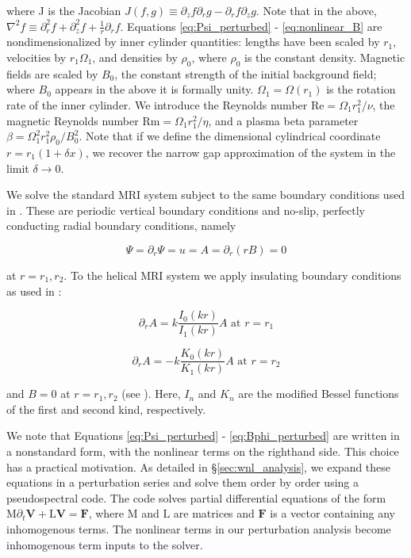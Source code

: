 \documentclass{emulateapj}
\newcommand{\beq}{\begin{equation}}
\newcommand{\eeq}{\end{equation}}
\newcommand{\citei}[1]{\citeauthor{#1} \citeyear{#1}}
\newcommand\reye{\mathrm{Re}}
\newcommand\reym{\mathrm{Rm}}
\begin{document}
where J is the Jacobian $J(f, g) \equiv \partial_z f \partial_r g - \partial_r f \partial_z g$. Note that in the above, $\nabla^2 f \equiv \partial_r^2 f + \partial_z^2 f + \frac{1}{r} \partial_r f$. Equations \ref{eq:Psi_perturbed} - \ref{eq:nonlinear_B} are nondimensionalized by inner cylinder quantities: lengths have been scaled by $r_1$, velocities by $r_1 \Omega_1$, and densities by $\rho_0$, where $\rho_0$ is the constant density. Magnetic fields are scaled by $B_0$, the constant strength of the initial background field; where $B_0$ appears in the above it is formally unity. $\Omega_1 = \Omega(r_1)$ is the rotation rate of the inner cylinder. We introduce the Reynolds number $\reye = \Omega_1 r_1^2/\nu$, the magnetic Reynolds number $\reym = \Omega_1 r_1^2 / \eta$, and a plasma beta parameter $\beta = \Omega_1^2 r_1^2 \rho_0/B_0^2$. Note that if we define the dimensional cylindrical coordinate $r = r_1(1 + \delta x)$, we recover the narrow gap approximation of the system in the limit $\delta \rightarrow 0$.

We solve the standard MRI system subject to the same boundary conditions used in \citet{Goodman:2002ix}. These are periodic vertical boundary conditions and no-slip, perfectly conducting radial boundary conditions, namely

\beq
\Psi = \partial_r \Psi = u = A = \partial_r (r B) = 0
\eeq

at $r = r_1, r_2$. To the helical MRI system we apply insulating boundary conditions as used in \citet{Hollerbach:2005tr}:

\beq
\partial_r A = k \frac{I_0 (k r)}{I_1 (k r)} A \, \, \mathrm{at} \, \, r = r_1
\eeq

\beq
\partial_r A = - k \frac{K_0 (k r)}{K_1 (k r)} A \, \, \mathrm{at} \, \, r = r_2
\eeq

and $B = 0$ at $r = r_1, r_2$ (see \citei{Willis:2002bh}). Here, $I_n$ and $K_n$ are the modified Bessel functions of the first and second kind, respectively.

We note that Equations \ref{eq:Psi_perturbed} - \ref{eq:Bphi_perturbed} are written in a nonstandard form, with the nonlinear terms on the righthand side. This choice has a practical motivation. As detailed in \S\ref{sec:wnl_analysis}, we expand these equations in a perturbation series and solve them order by order using a pseudospectral code. The code solves partial differential equations of the form $\mathrm{M} \partial_t \mathbf{V} + \mathrm{L} \mathbf{V} = \mathbf{F}$, where $\mathrm{M}$ and $\mathrm{L}$ are matrices and $\mathbf{F}$ is a vector containing any inhomogenous terms. The nonlinear terms in our perturbation analysis become inhomogenous term inputs to the solver.
\end{document}
